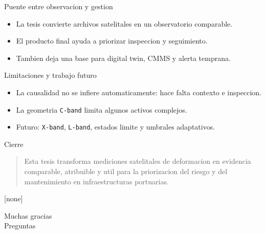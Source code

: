 \documentclass[aspectratio=169]{beamer}
\begin{document}
\begin{frame}{Puente entre observacion y gestion}
  \begin{itemize}
    \item La tesis convierte archivos satelitales en un observatorio comparable.
    \item El producto final ayuda a priorizar inspeccion y seguimiento.
    \item Tambien deja una base para digital twin, CMMS y alerta temprana.
  \end{itemize}
\end{frame}

\begin{frame}{Limitaciones y trabajo futuro}
  \begin{itemize}
    \item La causalidad no se infiere automaticamente: hace falta contexto e inspeccion.
    \item La geometria \texttt{C-band} limita algunos activos complejos.
    \item Futuro: \texttt{X-band}, \texttt{L-band}, estados limite y umbrales adaptativos.
  \end{itemize}
\end{frame}

\begin{frame}{Cierre}
  \begin{quote}
    Esta tesis transforma mediciones satelitales de deformacion en evidencia comparable, atribuible y util para la priorizacion del riesgo y del mantenimiento en infraestructuras portuarias.
  \end{quote}
\end{frame}

[none]
{
\begin{frame}[standout]
  Muchas gracias\\Preguntas
\end{frame}}
\end{document}
